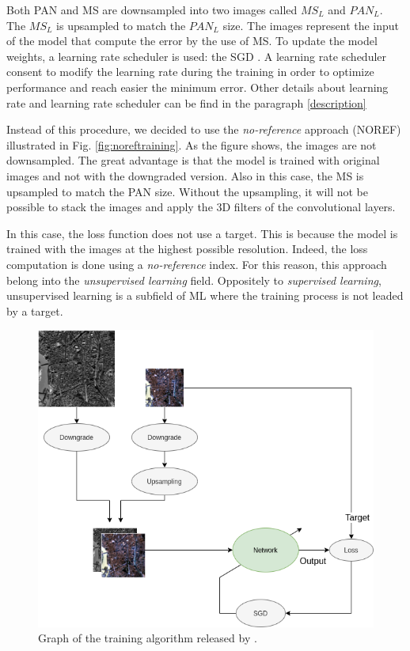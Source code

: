 \documentclass[12pt]{report}
\begin{document}
Both PAN and MS are downsampled into two images called $MS_L$ and $PAN_L$.
The $MS_L$ is upsampled to match the $PAN_L$ size.
The images represent the input of the model that compute the error by the use of MS.
To update the model weights, a learning rate scheduler is used: the SGD \cite{sgd}.
A learning rate scheduler consent to modify the learning rate during the training
in order to optimize performance and reach easier the minimum error.
Other details about learning rate and learning rate scheduler can be find in the paragraph \ref{description}

Instead of this procedure, we decided to use the \textit{no-reference} approach (NOREF) illustrated in Fig. \ref{fig:noreftraining}.
As the figure shows, the images are not downsampled. The great advantage is that 
the model is trained with original images and not with the downgraded version.
Also in this case, the MS is upsampled to match the PAN size.
Without the upsampling, it will not be possible to stack the images and apply the 3D filters of the convolutional layers.

In this case, the loss function does not use a target.
This is because the model is trained with the images at the highest possible resolution.
Indeed, the loss computation is done using a \textit{no-reference} index.
For this reason, this approach belong into the \textit{unsupervised learning} field.
Oppositely to \textit{supervised learning}, unsupervised learning is a subfield of ML where the training process is not leaded by a target.



\begin{figure}[t]
    \centering
    \includegraphics[scale=.45]{RRTraining.png}
    \caption{Graph of the training algorithm released by \cite{pnn}.}
    \label{fig:rrtraining}
\end{figure}
\end{document}
